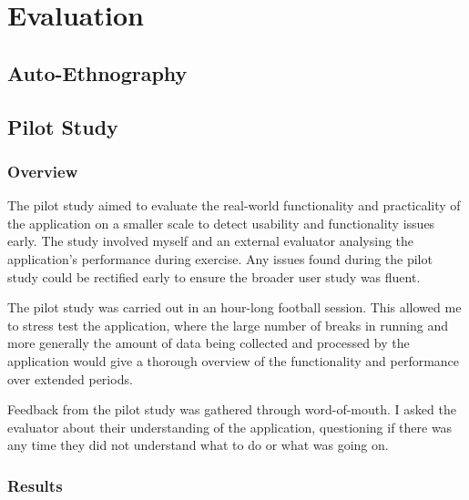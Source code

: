 \documentclass{l4proj}
\begin{document}
\chapter{Evaluation} 

\section{Auto-Ethnography}

\section{Pilot Study}

\subsection{Overview}

The pilot study aimed to evaluate the real-world functionality and practicality of the application on a smaller scale to detect usability and functionality issues early. The study involved myself and an external evaluator analysing the application’s performance during exercise. Any issues found during the pilot study could be rectified early to ensure the broader user study was fluent. 

The pilot study was carried out in an hour-long football session. This allowed me to stress test the application, where the large number of breaks in running and more generally the amount of data being collected and processed by the application would give a thorough overview of the functionality and performance over extended periods.

Feedback from the pilot study was gathered through word-of-mouth. I asked the evaluator about their understanding of the application, questioning if there was any time they did not understand what to do or what was going on. 

\subsection{Results}
\end{document}
